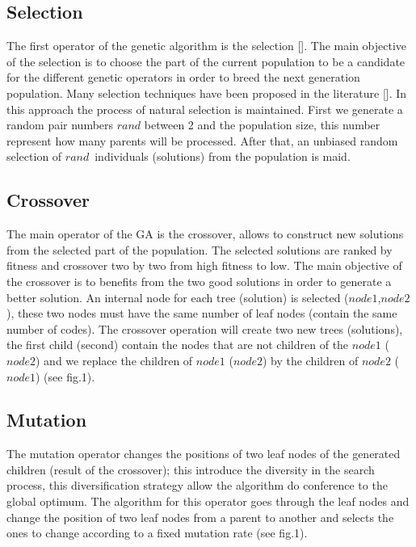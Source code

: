 \documentclass[preprint,12pt]{elsarticle}
\begin{document}
\subsection{Selection}
The first operator of the genetic algorithm is the selection []. The main objective of the selection is to choose the part of the current  population to be a candidate for the different genetic operators in order to breed the next generation population. Many selection techniques have been proposed in the literature []. In this approach the  process of natural selection is maintained. First we generate a random pair numbers \textit{$rand$} between 2 and the population size, this number represent how many parents will be processed. After that, an unbiased random selection of \textit{$rand$}~individuals (solutions) from the population is maid. 
\subsection{Crossover}
The main operator of the GA is the crossover, allows to construct new solutions from the selected part of the population. The selected solutions are ranked by fitness and crossover two by two from high fitness to low. The main objective of the crossover is to benefits from the two good solutions in order to generate a better solution. An internal node for each tree (solution) is selected (\textit{$node1$},\textit{$node2$}), these two nodes must have the same number of leaf nodes (contain the same number of codes). The crossover operation will create two new trees (solutions), the first child (second) contain the nodes that are not children of the \textit{$node1$} (\textit{$node2$}) and we replace the children of \textit{$node1$} (\textit{$node2$}) by the children of \textit{$node2$} (\textit{$node1$}) (see fig.1). 
\subsection{Mutation}
The mutation operator changes the positions of two leaf nodes of the generated children (result of the crossover); this introduce the diversity in the search process, this diversification strategy allow the algorithm do conference to the global optimum. The algorithm for this operator goes through the leaf nodes and change the position of two leaf nodes from a parent to another and selects the ones to change according to a fixed mutation rate (see fig.1).
\end{document}
